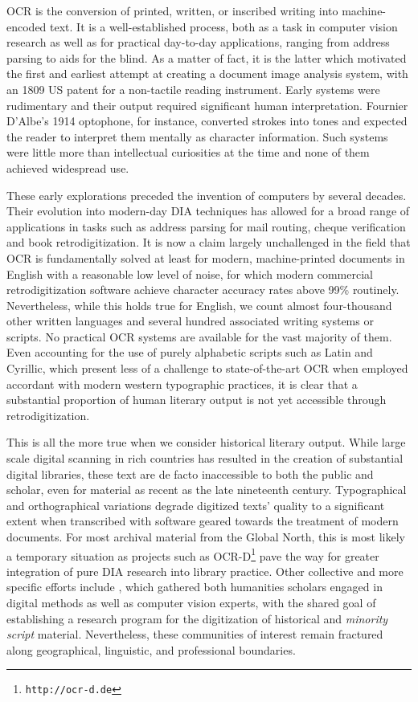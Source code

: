 OCR is the conversion of printed, written, or inscribed writing into
machine-encoded text. It is a well-established process, both as a task in
computer vision research as well as for practical day-to-day applications,
ranging from address parsing to aids for the blind. As a matter of fact, it is
the latter which motivated the first and earliest attempt at creating a
document image analysis system, with an 1809 US patent for a non-tactile
reading instrument. Early systems were rudimentary and their output required
significant human interpretation. Fournier D’Albe’s 1914 optophone, for
instance, converted strokes into tones and expected the reader to interpret
them mentally as character information. Such systems were little more than
intellectual curiosities at the time and none of them achieved widespread use.

These early explorations preceded the invention of computers by several
decades. Their evolution into modern-day DIA techniques has allowed for a broad
range of applications in tasks such as address parsing for mail routing, cheque
verification and book retrodigitization. It is now a claim largely unchallenged
in the field that OCR is fundamentally solved at least for modern,
machine-printed documents in English with a reasonable low level of noise, for
which modern commercial retrodigitization software achieve character accuracy
rates above 99\% routinely. Nevertheless, while this holds true for English, we
count almost four-thousand other written languages and several hundred associated
writing systems or scripts. No practical OCR systems are available for the vast
majority of them. Even accounting for the use of purely alphabetic scripts such
as Latin and Cyrillic, which present less of a challenge to state-of-the-art
OCR when employed accordant with modern western typographic practices, it is
clear that a substantial proportion of human literary output is not yet
accessible through retrodigitization.

This is all the more true when we consider historical literary output. While
large scale digital scanning in rich countries has resulted in the creation of
substantial digital libraries, these text are de facto inaccessible to both the
public and scholar, even for material as recent as the late nineteenth century.
Typographical and orthographical variations degrade digitized texts' quality to
a significant extent when transcribed with software geared towards the
treatment of modern documents. For most archival material from the Global
North, this is most likely a temporary situation as projects such as
OCR-D\footnote{\texttt{http://ocr-d.de}} pave the way for greater integration
of pure DIA research into library practice. Other collective and more specific
efforts include \cite{smith2018research}, which gathered both humanities
scholars engaged in digital methods as well as computer vision experts, with
the shared goal of establishing a research program for the digitization of
historical and \emph{minority script} material. Nevertheless, these communities
of interest remain fractured along geographical, linguistic, and professional
boundaries.

